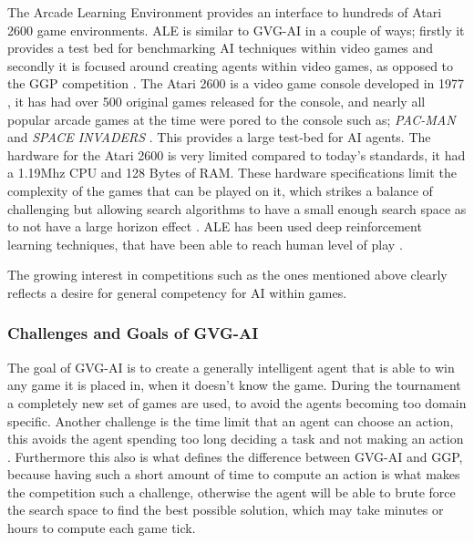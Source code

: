 \documentclass[journal]{IEEEtran}
\begin{document}
		The Arcade Learning Environment \cite{bellemare2013arcade} provides an interface to hundreds of Atari 2600 game environments. ALE is similar to GVG-AI in a couple of ways; firstly it provides a test bed for benchmarking AI techniques within video games and secondly it is focused around creating agents within video games, as opposed to the GGP competition \cite{GGP2005general}.
		The Atari 2600 is a video game console developed in 1977 , it has had over 500 original games released for the console, and nearly all popular arcade games at the time were pored to the console such as; \textit{PAC-MAN} and \textit{SPACE INVADERS} \cite{bellemare2013arcade}. This provides a large test-bed for AI agents.
		The hardware for the Atari 2600 is very limited compared to today's standards, it had a 1.19Mhz CPU and 128 Bytes of RAM. These hardware specifications limit the complexity of the games that can be played on it, which strikes a balance of challenging but allowing search algorithms to have a small enough search space as to not have a large horizon effect \cite{bellemare2013arcade}.
		ALE has been used deep reinforcement learning techniques, that have been able to reach human level of play \cite{mnih2015human, gaina2017rolling}.
		
		The growing interest in competitions such as the ones mentioned above clearly reflects a desire for general competency for AI within games.



	\subsubsection{Challenges and Goals of GVG-AI}

		The goal of GVG-AI is to create a generally intelligent agent that is able to win any game it is placed in, when it doesn't know the game.
		During the tournament a completely new set of games are used, to avoid the agents becoming too domain specific.
		Another challenge is the time limit that an agent can choose an action, this avoids the agent spending too long deciding a task and not making an action \cite{schuster2015mcts}. 
		Furthermore this also is what defines the difference between GVG-AI and GGP, because having such a short amount of time to compute an action is what makes the competition such a challenge, otherwise the agent will be able to brute force the search space to find the best possible solution, which may take minutes or hours to compute each game tick.
		
\end{document}
